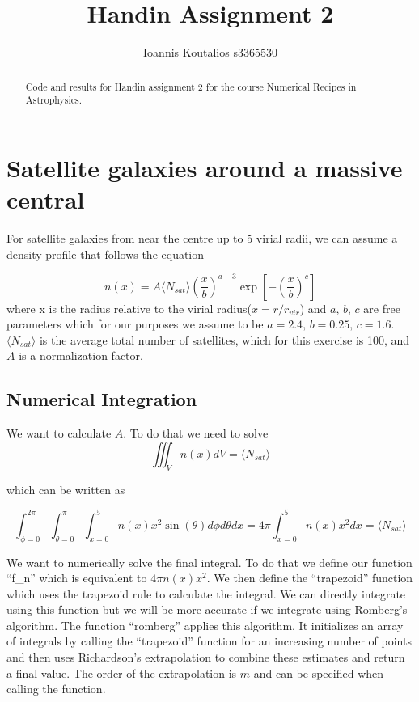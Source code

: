 \documentclass[a4paper,10pt]{article}
\title{Handin Assignment 2}
\author{Ioannis Koutalios s3365530}
\begin{document}
\maketitle

\begin{abstract}
 Code and results for Handin assignment 2 for the course Numerical Recipes in Astrophysics.
\end{abstract}

\section{Satellite galaxies around a massive central}

For satellite galaxies from near the centre up to 5 virial radii, we can assume a density profile that follows the equation

\begin{equation}
  n(x) = A \langle N_{sat} \rangle \left(\frac{x}{b}\right)^{a-3} \exp[-\left(\frac{x}{b}\right)^c]
\end{equation}
where x is the radius relative to the virial radius($x=r/r_{vir}$) and $a,\, b,\, c$ are free parameters which for our purposes we assume to be $a=2.4,\, b = 0.25,\, c = 1.6$. $\langle N_{sat} \rangle $ is the average total number of satellites, which for this exercise is 100, and $A$ is a normalization factor. 

\subsection{Numerical Integration}

We want to calculate $A$. To do that we need to solve 
\begin{equation}
  \iiint_V n(x) dV = \langle N_{sat} \rangle 
\end{equation}

which can be written as 

\begin{equation}
  \int_{\phi=0}^{2\pi} \int_{\theta=0}^{\pi} \int_{x=0}^{5} n(x) x^2 \sin(\theta) d\phi d\theta dx = 4 \pi \int_{x=0}^{5} n(x) x^2 dx = \langle N_{sat} \rangle 
\end{equation}

We want to numerically solve the final integral. To do that we define our function ``f\_n'' which is equivalent to $4 \pi n(x) x^2$. We then define the ``trapezoid'' function which uses the trapezoid rule to calculate the integral. We can directly integrate using this function but we will be more accurate if we integrate using Romberg's algorithm. The function ``romberg'' applies this algorithm. It initializes an array of integrals by calling the ``trapezoid'' function for an increasing number of points and then uses Richardson's extrapolation to combine these estimates and return a final value. The order of the extrapolation is $m$ and can be specified when calling the function.    
\end{document}

